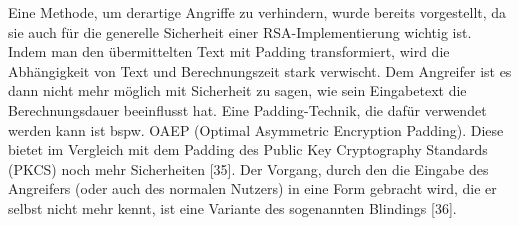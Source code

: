 \documentclass[conference,10pt,a4paper,twocolumn]{IEEEtran}
\begin{document}
\newline
Eine Methode, um derartige Angriffe zu verhindern, wurde bereits vorgestellt, da sie auch für die generelle Sicherheit einer RSA-Implementierung wichtig ist. Indem man den übermittelten Text mit Padding transformiert, wird die Abhängigkeit von Text und Berechnungszeit stark verwischt. Dem Angreifer ist es dann nicht mehr möglich mit Sicherheit zu sagen, wie sein Eingabetext die Berechnungsdauer beeinflusst hat. Eine Padding-Technik, die dafür verwendet werden kann ist bspw. OAEP (Optimal Asymmetric Encryption Padding). Diese bietet im Vergleich mit dem Padding des Public Key Cryptography Standards (PKCS) noch mehr Sicherheiten [35]. Der Vorgang, durch den die Eingabe des Angreifers (oder auch des normalen Nutzers) in eine Form gebracht wird, die er selbst nicht mehr kennt, ist eine Variante des sogenannten Blindings [36].
\end{document}
